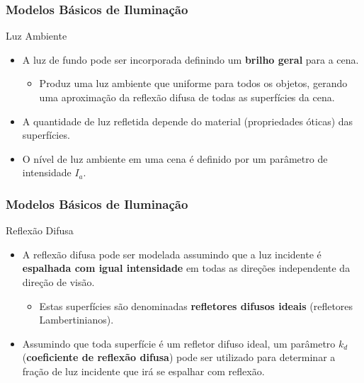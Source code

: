 \documentclass{beamer}
\begin{document}
\begin{frame}
\frametitle{Modelos Básicos de Iluminação}

	\begin{block}{Luz Ambiente}
		\begin{itemize}
			\item A luz de fundo pode ser incorporada definindo um \textbf{brilho geral} para a cena.
			\begin{itemize}
				\item Produz uma luz ambiente que uniforme para todos os objetos, gerando uma aproximação da reflexão difusa de todas as superfícies da cena.
			\end{itemize}
			\item A quantidade de luz refletida depende do material (propriedades óticas) das superfícies.
			\item O nível de luz ambiente em uma cena é definido por um parâmetro de intensidade $I_a$.
		\end{itemize}
	\end{block}
	
\end{frame}

\begin{frame}
\frametitle{Modelos Básicos de Iluminação}

	\begin{block}{Reflexão Difusa}
		\begin{itemize}
			\item A reflexão difusa pode ser modelada assumindo que a luz incidente é \textbf{espalhada com igual intensidade} em todas as direções independente da direção de visão.
			\begin{itemize}
				\item Estas superfícies são denominadas \textbf{refletores difusos ideais} (refletores Lambertinianos).
			\end{itemize}
			\item Assumindo que toda superfície é um refletor difuso ideal, um parâmetro $k_d$(\textbf{coeficiente de reflexão difusa}) pode ser utilizado para determinar a fração de luz incidente que irá se espalhar com reflexão.
								 
		\end{itemize}
	\end{block}
	
\end{frame}
\end{document}
